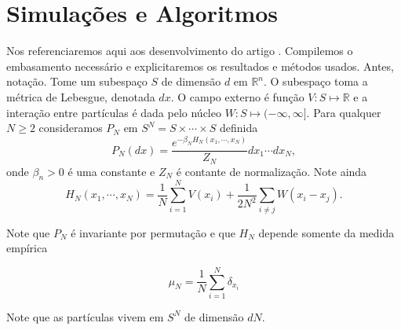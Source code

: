 \chapter{Simulações e Algoritmos}
\label{Capitulo: Simulações}

Nos referenciaremos aqui aos desenvolvimento do artigo \cite{Chafa2018}. Compilemos o embasamento necessário e explicitaremos os resultados e métodos usados. Antes, notação. Tome um subespaço $S$ de dimensão $d$ em $\mathbb{R}^n$. O subespaço toma a métrica de Lebesgue, denotada $dx$. O campo externo é função $V : S \mapsto \mathbb{R}$ e a interação entre partículas é dada pelo núcleo $W : S \mapsto (-\infty, \infty]$. Para qualquer $N \geq 2$ consideramos $P_N$ em $S^N = S \times \cdots \times S$ definida $$ P_N(dx) = \frac{e^{-\beta_N H_N(x_1,\cdots,x_N)}}{Z_N} dx_1 \cdots dx_N, $$onde $\beta_n > 0$ é uma constante e $Z_N$ é contante de normalização. Note ainda $$ H_N(x_1, \cdots, x_N) = \frac{1}{N} \sum_{i=1}^{N} V(x_i) + \frac{1}{2N^2} \sum_{i\neq j} W(x_i - x_j).$$

Note que $P_N$ é invariante por permutação e que $H_N$ depende somente da medida empírica

\[
\mu_N = \frac{1}{N} \sum_{i=1}^{N} \delta_{x_i}
\]

Note que as partículas vivem em $S^N$ de dimensão $dN$.












